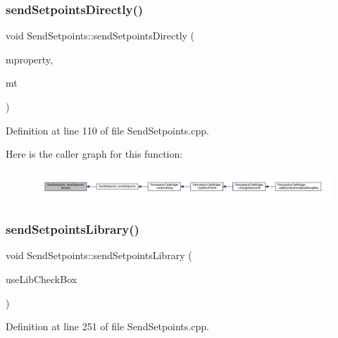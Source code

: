 \subsubsection{\texorpdfstring{send\+Setpoints\+Directly()}{sendSetpointsDirectly()}}
{\footnotesize\ttfamily void Send\+Setpoints\+::send\+Setpoints\+Directly (\begin{DoxyParamCaption}\item[{\hyperlink{class_send_setpoints_a1205563976ed70d7beace23697cd0b06}{Treadmill\+Property}}]{mproperty,  }\item[{\hyperlink{class_send_setpoints_a36f865e2cf8a800b6226ff7b6b03abcd}{Setpoint\+Type}}]{mt }\end{DoxyParamCaption})}



Definition at line 110 of file Send\+Setpoints.\+cpp.

Here is the caller graph for this function\+:
\nopagebreak
\begin{figure}[H]
\begin{center}
\leavevmode
\includegraphics[width=350pt]{class_send_setpoints_ae4415d646c6de144cad9682b7afa1026_icgraph}
\end{center}
\end{figure}
\mbox{\label{class_send_setpoints_a8a8b8a1dbc121419b3708f359285394d}} 
\subsubsection{\texorpdfstring{send\+Setpoints\+Library()}{sendSetpointsLibrary()}}
{\footnotesize\ttfamily void Send\+Setpoints\+::send\+Setpoints\+Library (\begin{DoxyParamCaption}\item[{bool}]{use\+Lib\+Check\+Box }\end{DoxyParamCaption})}



Definition at line 251 of file Send\+Setpoints.\+cpp.

